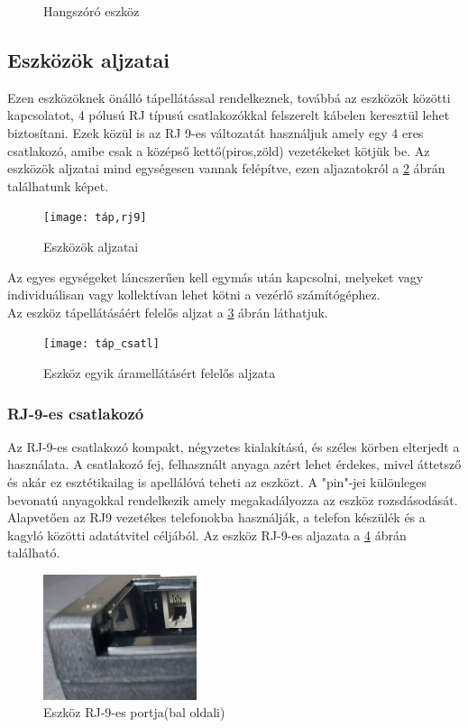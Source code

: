 \documentclass[tocnopagenum]{thesis-ekf}
\theoremstyle{definition}
\theoremstyle{remark}
\begin{document}
\begin{figure}[H]
		\caption[Hangszóró eszköz]{Hangszóró eszköz}
		\label{fig:hangsz01}
	\end{figure}
	\subsection{Eszközök aljzatai}
	\label{eszkozcsatlakozok}
	Ezen eszközöknek önálló tápellátással rendelkeznek, továbbá az eszközök közötti kapcsolatot, 4 pólusú RJ típusú csatlakozókkal felszerelt kábelen keresztül lehet biztosítani. Ezek közül is az RJ 9-es változatát használjuk amely egy 4 eres csatlakozó, amibe csak a középső kettő(piros,zöld) vezetékeket kötjük be.
	Az eszközök aljzatai mind egységesen vannak felépítve, ezen aljazatokról a \ref{fig:csatlakozo} ábrán találhatunk képet.
	\begin{figure}[h!]	
		\centering
		\texttt{[image: táp,rj9]}
		\caption[Eszközök aljzatai]{Eszközök aljzatai}
		\label{fig:csatlakozo}
	\end{figure}
	\newpage
	Az egyes egységeket láncszerűen kell egymás után kapcsolni, melyeket vagy individuálisan vagy kollektívan lehet kötni a vezérlő számítógéphez. 	\\
	Az eszköz tápellátásáért felelős aljzat a \ref{fig:tápcsatl} ábrán láthatjuk.
	\begin{figure}[H]	
		\centering
		\texttt{[image: táp\_csatl]}
		\caption[Eszköz egyik áramellátásért felelős aljzata]{Eszköz egyik áramellátásért felelős aljzata}
		\label{fig:tápcsatl}
	\end{figure}
	
	\subsubsection{RJ-9-es csatlakozó}
	Az RJ-9-es csatlakozó kompakt, négyzetes kialakítású, és széles körben elterjedt a használata. A csatlakozó fej, felhasznált anyaga azért lehet érdekes, mivel áttetsző és akár ez esztétikailag is apellálóvá teheti az eszközt.
	A "pin"-jei különleges bevonatú anyagokkal rendelkezik amely megakadályozza az eszköz rozsdásodását. \cite{rj9Pros}
	Alapvetően az RJ9 vezetékes telefonokba használják, a telefon készülék és a kagyló közötti adatátvitel céljából.\cite{RJ9ok}
	Az eszköz RJ-9-es aljazata a \ref{fig:rj9csatl} ábrán található.
	\\
	\begin{figure}[H]	
		\centering
		\includegraphics[page=1,width=0.4\textwidth]{rj9_csatl}
		\caption[Eszközök bemeneti portjai]{Eszköz RJ-9-es portja(bal oldali)}
		\label{fig:rj9csatl}
	\end{figure}
\newpage
\end{document}

